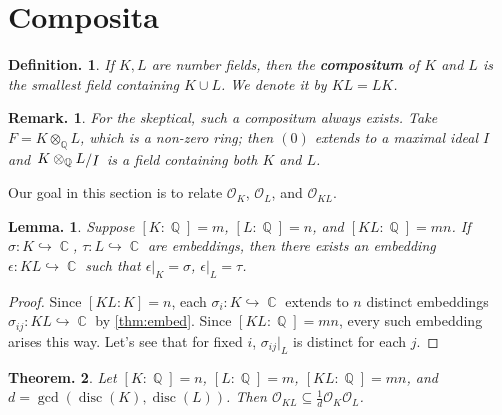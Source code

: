 \documentclass[11pt, a4paper]{memoir}
\DeclareMathOperator{\Q}{{\mathbb{Q}}}
\DeclareMathOperator{\C}{{\mathbb{C}}}
\newcommand{\hto}[0]{\ensuremath{\hookrightarrow}}
\theoremstyle{change}
\newtheorem{theorem}{Theorem.}[section]
\newtheorem{lemma}[theorem]{Lemma.}
\theoremstyle{plain}
\theoremstyle{nonumberplain}
\newtheorem{definition}{Definition.}
\newtheorem{remark}{Remark.}
\newtheorem{proof}{Proof}
\DeclareMathOperator{\disc}{disc}
\newcommand{\quot}[2]{\mathchoice{\left.\raisebox{0.14em}{$#1$}\middle/\raisebox{-0.14em}{$#2$}\right.}
                                 {\left.\raisebox{0.08em}{$#1$}\middle/\raisebox{-0.08em}{$#2$}\right.}
                                 {\left.\raisebox{0.03em}{$#1$}\middle/\raisebox{-0.03em}{$#2$}\right.}
                                 {\left.\raisebox{0em}{$#1$}\middle/\raisebox{0em}{$#2$}\right.}}
\begin{document}
\section{Composita}
\begin{definition}
    If $K,L$ are number fields, then the \textbf{compositum} of $K$ and $L$ is the smallest field containing $K\cup L$.
    We denote it by $KL=LK$.
\end{definition}
\begin{remark}
    For the skeptical, such a compositum always exists.
    Take $F=K\otimes_{\Q} L$, which is a non-zero ring; then $(0)$ extends to a maximal ideal $I$ and $\quot{K\otimes_{\Q} L}{I}$ is a field containing both $K$ and $L$.
\end{remark}
Our goal in this section is to relate $\mathcal{O}_K$, $\mathcal{O}_L$, and $\mathcal{O}_{KL}$.
\begin{lemma}\label{lem:ext-comp}
    Suppose $[K:\Q]=m$, $[L:\Q]=n$, and $[KL:\Q]=mn$.
    If $\sigma:K\hto\C$, $\tau:L\hto\C$ are embeddings, then there exists an embedding $\epsilon:KL\hto\C$ such that $\epsilon|_K=\sigma$, $\epsilon|_L=\tau$.
\end{lemma}
\begin{proof}
    Since $[KL:K]=n$, each $\sigma_i:K\hto\C$ extends to $n$ distinct embeddings $\sigma_{ij}:KL\hto\C$ by \cref{thm:embed}.
    Since $[KL:\Q]=mn$, every such embedding arises this way.
    Let's see that for fixed $i$, $\sigma_{ij}|_L$ is distinct for each $j$.
\end{proof}
\begin{theorem}\label{thm:comp}
    Let $[K:\Q]=n$, $[L:\Q]=m$, $[KL:\Q]=mn$, and $d=\gcd(\disc(K),\disc(L))$.
    Then $\mathcal{O}_{KL}\subseteq\frac{1}{d}\mathcal{O}_K\mathcal{O}_L$.
\end{theorem}
\end{document}
